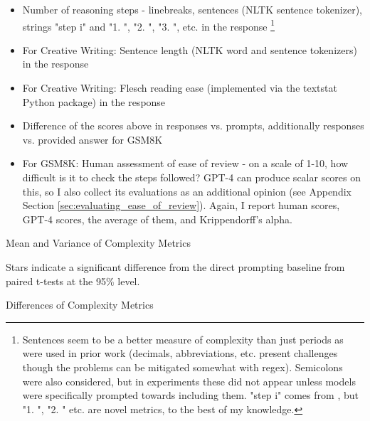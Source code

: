 \documentclass[11pt]{article}
\begin{document}
\begin{itemize}
  \item Number of reasoning steps - linebreaks, sentences (NLTK sentence tokenizer), strings "step i" and "1. ", "2. ", "3. ", etc. in the response \cite{fu_complexity-based_2023} \footnote{Sentences seem to be a better measure of complexity than just periods as were used in prior work (decimals, abbreviations, etc. present challenges though the problems can be mitigated somewhat with regex). Semicolons were also considered, but in experiments these did not appear unless models were specifically prompted towards including them. "step i" comes from \citealp{fu_complexity-based_2023}, but "1. ", "2. " etc. are novel metrics, to the best of my knowledge.}
  \item For Creative Writing: Sentence length (NLTK word and sentence tokenizers) in the response
  \item For Creative Writing: Flesch reading ease (implemented via the textstat Python package) in the response \cite{flesch_how_2016, aggarwal_textstat_nodate}
  \item Difference of the scores above in responses vs. prompts, additionally responses vs. provided answer for GSM8K
  \item For GSM8K: Human assessment of ease of review - on a scale of 1-10, how difficult is it to check the steps followed? GPT-4 can produce scalar scores on this, so I also collect its evaluations as an additional opinion (see Appendix Section \ref{sec:evaluating_ease_of_review}). Again, I report human scores, GPT-4 scores, the average of them, and Krippendorff's alpha.
\end{itemize}

%

\onecolumn

\begin{table}
  \caption{Mean and Variance of Complexity Metrics}
  \centering
  \tiny
    
  \label{tab:avg_complexity_metrics_pivot}
  \newline \newline \footnotesize Stars indicate a significant difference from the direct prompting baseline from paired t-tests at the 95\% level.
\end{table}

\begin{table}
  \caption{Differences of Complexity Metrics}
  \centering
  \tiny
    
  \label{tab:avg_complexity_diff_metrics_pivot}
\end{table}
\end{document}
